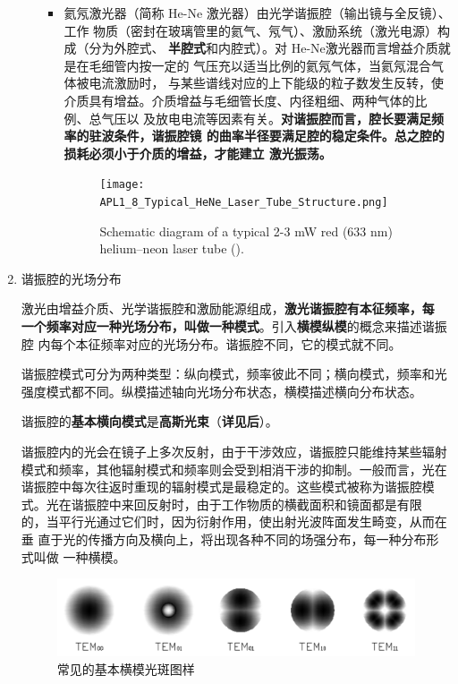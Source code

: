 \begin{enumerate}
\begin{itemize}
\begin{itemize}
			\item 氦氖激光器（简称 He-Ne 激光器）由光学谐振腔（输出镜与全反镜）、工作
			物质（密封在玻璃管里的氦气、氖气）、激励系统（激光电源）构成（分为外腔式、
			\textbf{半腔式}和内腔式）。对 He-Ne激光器而言增益介质就是在毛细管内按一定的
			气压充以适当比例的氦氖气体，当氦氖混合气体被电流激励时，
			与某些谱线对应的上下能级的粒子数发生反转，使
			介质具有增益。介质增益与毛细管长度、内径粗细、两种气体的比例、总气压以
			及放电电流等因素有关。\textbf{对谐振腔而言，腔长要满足频率的驻波条件，谐振腔镜
			的曲率半径要满足腔的稳定条件。总之腔的损耗必须小于介质的增益，才能建立
			激光振荡。}
			\begin{figure}[h]
				\centering
				\texttt{[image: APL1\_8\_Typical\_HeNe\_Laser\_Tube\_Structure.png]}
				\caption{Schematic diagram of a typical 2-3 mW red (633 nm) helium–neon laser tube (\cite{a}).}
				\label{fig:apl18typicalhenelasertubestructure}
			\end{figure}
		\end{itemize}
	\end{itemize}
	
	\item 谐振腔的光场分布
	
	激光由增益介质、光学谐振腔和激励能源组成，\textbf{激光谐振腔有本征频率，每
	一个频率对应一种光场分布，叫做一种模式}。引入\textbf{横模纵模}的概念来描述谐振腔
	内每个本征频率对应的光场分布。谐振腔不同，它的模式就不同。
	
	谐振腔模式可分为两种类型：纵向模式，频率彼此不同；横向模式，频率和光强度模式都不同。纵模描述轴向光场分布状态，横模描述横向分布状态。
	
	谐振腔的\textbf{基本横向模式}是\textbf{高斯光束}（\textbf{详见后}）。
	
	谐振腔内的光会在镜子上多次反射，由于干涉效应，谐振腔只能维持某些辐射模式和频率，其他辐射模式和频率则会受到相消干涉的抑制。一般而言，光在谐振腔中每次往返时重现的辐射模式是最稳定的。这些模式被称为谐振腔模式。光在谐振腔中来回反射时，由于工作物质的横截面积和镜面都是有限
	的，当平行光通过它们时，因为衍射作用，使出射光波阵面发生畸变，从而在垂
	直于光的传播方向及横向上，将出现各种不同的场强分布，每一种分布形式叫做
	一种横模。
	
	\begin{figure}[h]
		\centering
		\includegraphics[width=0.7\linewidth]{images/APL1_8_TEM}
		\caption{常见的基本横模光斑图样}
		\label{fig:apl18tem}
	\end{figure}
	

\end{enumerate}
